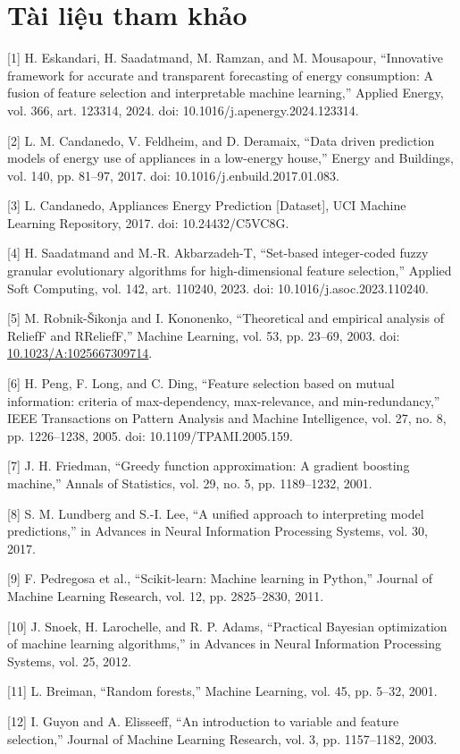 \chapter*{Tài liệu tham khảo}
{[}1{]} H. Eskandari, H. Saadatmand, M. Ramzan, and M. Mousapour, ``Innovative framework for accurate and transparent forecasting of energy consumption: A fusion of feature selection and interpretable machine learning,'' Applied Energy, vol. 366, art. 123314, 2024. doi: 10.1016/j.apenergy.2024.123314.

{[}2{]} L. M. Candanedo, V. Feldheim, and D. Deramaix, ``Data driven prediction models of energy use of appliances in a low-energy house,'' Energy and Buildings, vol. 140, pp. 81--97, 2017. doi: 10.1016/j.enbuild.2017.01.083.

{[}3{]} L. Candanedo, Appliances Energy Prediction {[}Dataset{]}, UCI Machine Learning Repository, 2017. doi: 10.24432/C5VC8G.

{[}4{]} H. Saadatmand and M.-R. Akbarzadeh-T, ``Set-based integer-coded fuzzy granular evolutionary algorithms for high-dimensional feature selection,'' Applied Soft Computing, vol. 142, art. 110240, 2023. doi: 10.1016/j.asoc.2023.110240.

{[}5{]} M. Robnik-Šikonja and I. Kononenko, ``Theoretical and empirical analysis of ReliefF and RReliefF,'' Machine Learning, vol. 53, pp. 23--69, 2003. doi: \url{10.1023/A:1025667309714}.

{[}6{]} H. Peng, F. Long, and C. Ding, ``Feature selection based on mutual information: criteria of max-dependency, max-relevance, and min-redundancy,'' IEEE Transactions on Pattern Analysis and Machine Intelligence, vol. 27, no. 8, pp. 1226--1238, 2005. doi: 10.1109/TPAMI.2005.159.

{[}7{]} J. H. Friedman, ``Greedy function approximation: A gradient boosting machine,'' Annals of Statistics, vol. 29, no. 5, pp. 1189--1232, 2001.

{[}8{]} S. M. Lundberg and S.-I. Lee, ``A unified approach to interpreting model predictions,'' in Advances in Neural Information Processing Systems, vol. 30, 2017.

{[}9{]} F. Pedregosa et al., ``Scikit-learn: Machine learning in Python,'' Journal of Machine Learning Research, vol. 12, pp. 2825--2830, 2011.

{[}10{]} J. Snoek, H. Larochelle, and R. P. Adams, ``Practical Bayesian optimization of machine learning algorithms,'' in Advances in Neural Information Processing Systems, vol. 25, 2012.

{[}11{]} L. Breiman, ``Random forests,'' Machine Learning, vol. 45, pp. 5--32, 2001.

{[}12{]} I. Guyon and A. Elisseeff, ``An introduction to variable and feature selection,'' Journal of Machine Learning Research, vol. 3, pp. 1157--1182, 2003.
